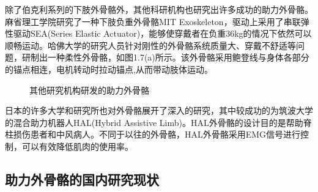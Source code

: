 除了伯克利系列的下肢外骨骼外，其他科研机构也研究出许多成功的助力外骨骼。麻省理工学院研究了一种下肢负重外骨骼MIT Exoskeleton\cite{p11}，驱动上采用了串联弹性驱动SEA(Series Elastic Actuator)，能够使穿戴者在负重36kg的情况下依然可以顺畅运动。哈佛大学的研究人员针对刚性的外骨骼系统质量大、穿戴不舒适等问题，研制出一种柔性外骨骼\cite{p12}，如图1.7(a)所示。该外骨骼采用鲍登线与身体各部分的锚点相连，电机转动时拉动锚点,从而带动肢体运动。
\begin{figure}[htb]
    \quad
    \caption{其他研究机构研发的助力外骨骼}
    \label{fig:subfigss}
\end{figure}

日本的许多大学和研究所也对外骨骼展开了深入的研究，其中较成功的为筑波大学的混合助力机器人HAL\cite{p13}(Hybrid Assistive Limb)。HAL外骨骼的设计目的是帮助脊柱损伤患者和中风病人。不同于以往的外骨骼，HAL外骨骼采用EMG信号进行控制，可以有效降低肌肉的使用率。

\subsection{助力外骨骼的国内研究现状}

